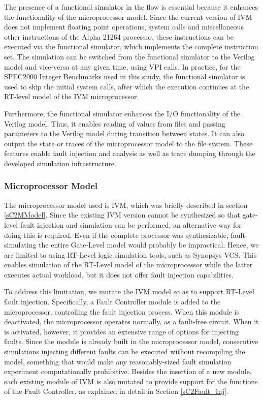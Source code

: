 \documentclass[12pt]{yalephd}
\begin{document}
The presence of a functional simulator in the flow is essential because it enhances the functionality of the microprocessor model. Since the current version of IVM does not implement floating point operations, system calls and miscellaneous other instructions of the Alpha 21264 processor, these instructions can be executed via the functional simulator, which implements the complete instruction set. The simulation can be switched from the functional simulator to the Verilog model and vice-versa at any given time, using VPI calls. In practice, for the SPEC2000 Integer Benchmarks used in this study, the functional simulator is used to skip the initial system calls, after which the execution continues at the RT-level model of the IVM microprocessor.

Furthermore, the functional simulator enhances the I/O functionality of the Verilog model. Thus, it enables reading of values from files and passing parameters to the Verilog model during transition between states. It can also output the state or traces of the microprocessor model to the file system. These features enable fault injection and analysis as well as trace dumping through the developed simulation infrastructure.

\subsubsection{Microprocessor Model}

The microprocessor model used is IVM, which was briefly described in section \ref{sC2MModel}. Since the existing IVM version cannot be synthesized so that gate-level fault injection and simulation can be performed, an alternative way for doing this is required. Even if the complete processor was synthesizable, fault-simulating the entire Gate-Level model would probably be impractical. Hence, we are limited to using RT-Level logic simulation tools, such as Synopsys VCS. This enables simulation of the RT-Level model of the microprocessor while the latter executes actual workload, but it does not offer fault injection capabilities.

To address this limitation, we mutate the IVM model so as to support RT-Level fault injection. Specifically, a Fault Controller module is added to the microprocessor, controlling the fault injection process. When this module is deactivated, the microprocessor operates normally, as a fault-free circuit. When it is activated, however, it provides an extensive range of options for injecting faults. Since the module is already built in the microprocessor model, consecutive simulations injecting different faults can be executed without recompiling the model, something that would make any reasonably-sized fault simulation experiment computationally prohibitive. Besides the insertion of a new module, each existing module of IVM is also mutated to provide support for the functions of the Fault Controller, as explained in detail in Section \ref{sC2Fault_Inj}.
\end{document}
